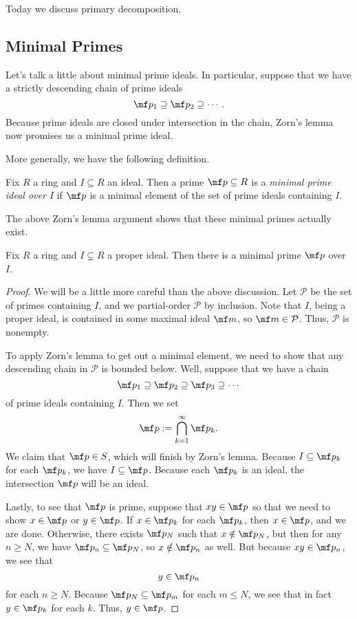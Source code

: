 \documentclass[../notes.tex]{subfiles}
\begin{document}

Today we discuss primary decomposition.

\subsection{Minimal Primes}

Let's talk a little about minimal prime ideals. In particular, suppose that we have a strictly descending chain of prime ideals
\[\mf p_1\supseteq\mf p_2\supseteq\cdots.\]
Because prime ideals are closed under intersection in the chain, Zorn's lemma now promises us a minimal prime ideal.

More generally, we have the following definition.
\begin{definition}
	Fix $R$ a ring and $I\subseteq R$ an ideal. Then a prime $\mf p\subseteq R$ is a \textit{minimal prime ideal over $I$} if $\mf p$ is a minimal element of the set of prime ideals containing $I$.
\end{definition}
The above Zorn's lemma argument shows that these minimal primes actually exist.
\begin{proposition} \label{prop:minprimeexist}
	Fix $R$ a ring and $I\subsetneq R$ a proper ideal. Then there is a minimal prime $\mf p$ over $I$.
\end{proposition}
\begin{proof}
	We will be a little more careful than the above discussion. Let $\mathcal P$ be the set of primes containing $I$, and we partial-order $\mathcal P$ by inclusion. Note that $I$, being a proper ideal, is contained in some maximal ideal $\mf m$, so $\mf m\in\mathcal P$. Thus, $\mathcal P$ is nonempty.

	To apply Zorn's lemma to get out a minimal element, we need to show that any descending chain in $\mathcal P$ is bounded below. Well, suppose that we have a chain
	\[\mf p_1\supseteq\mf p_2\supseteq\mf p_3\supseteq\cdots\]
	of prime ideals containing $I$. Then we set
	\[\mf p:=\bigcap_{k=1}^\infty\mf p_k.\]
	We claim that $\mf p\in S$, which will finish by Zorn's lemma. Because $I\subseteq\mf p_k$ for each $\mf p_k$, we have $I\subseteq\mf p$. Because each $\mf p_k$ is an ideal, the intersection $\mf p$ will be an ideal.
	
	Lastly, to see that $\mf p$ is prime, suppose that $xy\in\mf p$ so that we need to show $x\in\mf p$ or $y\in\mf p$. If $x\in\mf p_k$ for each $\mf p_k$, then $x\in\mf p$, and we are done. Otherwise, there exists $\mf p_N$ such that $x\notin\mf p_N$, but then for any $n\ge N$, we have $\mf p_n\subseteq\mf p_N$, so $x\notin\mf p_n$ as well. But because $xy\in\mf p_n$, we see that
	\[y\in\mf p_n\]
	for each $n\ge N$. Because $\mf p_N\subseteq\mf p_m$ for each $m\le N$, we see that in fact $y\in\mf p_k$ for each $k$. Thus, $y\in\mf p$.
\end{proof}
\end{document}
